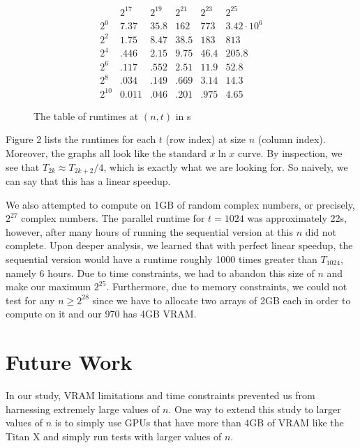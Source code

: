 \documentclass[notitlepage, twocolumn]{article}
\begin{document}
\begin{figure}\label{res-table}
	\centering
	\begin{small}
	\[
		\begin{array}{r|c|c|c|c|c}
			& 2^{17} & 2^{19} & 2^{21} & 2^{23} & 2^{25}\\\hline
			2^0& 7.37 & 35.8 & 162 & 773 & 3.42\cdot10^6\\\hline
			2^2& 1.75 & 8.47 & 38.5 & 183  & 813\\\hline
			2^4& .446 & 2.15 & 9.75 & 46.4 & 205.8\\\hline
			2^6& .117 & .552 & 2.51 & 11.9 & 52.8\\\hline
			2^8& .034 & .149 & .669 & 3.14 & 14.3\\\hline
			2^{10}& 0.011 & .046 & .201 & .975 & 4.65
		\end{array}
	\]
	\end{small}
	\caption{The table of runtimes at $(n,t)$ in s}
\end{figure}

Figure 2 lists the runtimes for each $t$ (row index) at size $n$ (column index).
Moreover, the graphs all look like the standard $x\ln x$ curve.
By inspection, we see that $T_{2k}\approx T_{2k+2}/4$, which is exactly what we are looking for.
So naively, we can say that this has a linear speedup.

We also attempted to compute on 1GB of random complex numbers, or precisely, $2^{27}$ complex numbers.
The parallel runtime for $t=1024$ was approximately 22s, however, after many hours of running the sequential version at this $n$ did not complete.
Upon deeper analysis, we learned that with perfect linear speedup, the sequential version would have a runtime roughly 1000 times greater than $T_{1024}$, namely 6 hours.
Due to time constraints, we had to abandon this size of $n$ and make our maximum $2^{25}$.
Furthermore, due to memory constraints, we could not test for any $n\geq 2^{28}$ since we have to allocate two arrays of 2GB each in order to compute on it and our 970 has 4GB VRAM.

\section{Future Work}

In our study, VRAM limitations and time constraints prevented us from harnessing extremely large values of $n$.
One way to extend this study to larger values of $n$ is to simply use GPUs that have more than 4GB of VRAM like the Titan X and simply run tests with larger values of $n$.
\end{document}
